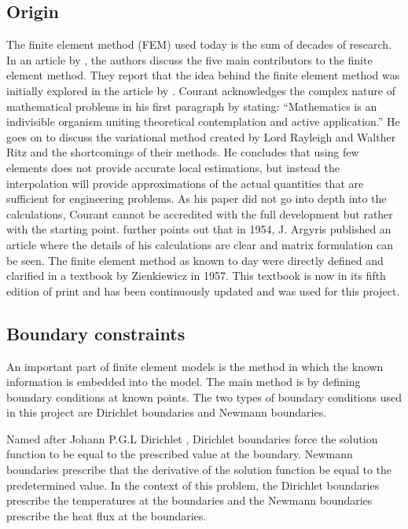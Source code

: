 	\subsection{Origin}
	The finite element method  (FEM) used today is the sum of decades of research. 
	In an article by \citet{Gupta:1996}, the authors discuss the five main contributors to the finite element method. 
	They report that the idea behind the finite element method was initially explored in the \citeyear{Courant:1943} article by \citeauthor{Courant:1943}.
	Courant acknowledges the complex nature of mathematical problems in his first paragraph by stating: ``Mathematics is an indivisible organism uniting theoretical contemplation and active application.''
	He goes on to discuss the variational method created by Lord Rayleigh and Walther Ritz and the shortcomings of their methods.
	He concludes that using few elements does not provide accurate local estimations, but instead the interpolation will provide approximations of the actual quantities that are sufficient for engineering problems.
	As his paper did not go into depth into the calculations, Courant cannot be accredited with the full development but rather with the starting point.
	\citet{Gupta:1996} further points out that in 1954, J. Argyris published an article  where the details of his calculations are clear and matrix formulation can be seen.
	The finite element method as known to day were directly defined and clarified in a textbook by Zienkiewicz in 1957.
	This textbook is now in its fifth edition of print and has been continuously updated and was used for this project.
	
	\subsection{Boundary constraints}
	An important part of finite element models is the method in which the known information is embedded into the model.
	The main method is by defining boundary conditions at known points. The two types of boundary conditions used in this project are Dirichlet boundaries and Newmann boundaries.
	
	Named after Johann P.G.L Dirichlet \citep{Cheng:2005}, Dirichlet boundaries force the solution function to be equal to the prescribed value at the boundary. 
	Newmann boundaries prescribe that the derivative of the solution function be equal to the predetermined value. 
	In the context of this problem, the Dirichlet boundaries prescribe the temperatures at the boundaries and the Newmann boundaries prescribe the heat flux at the boundaries.
	
